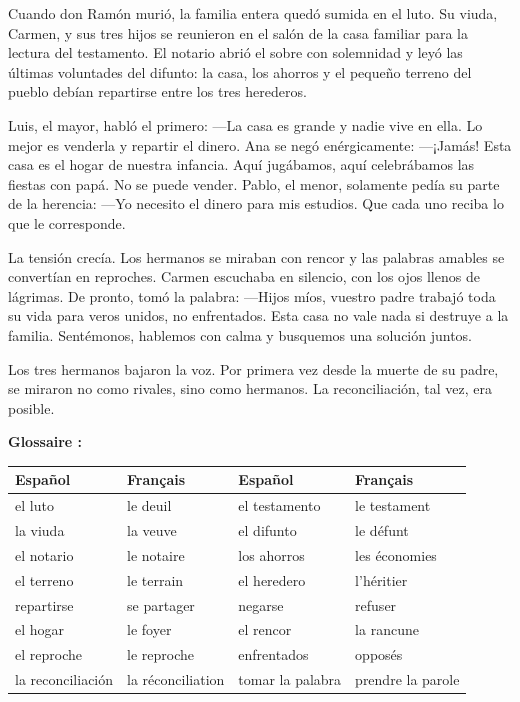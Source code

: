 \documentclass[11pt]{article}
\begin{document}
\begin{textebox}
Cuando don Ramón murió, la familia entera quedó sumida en el luto. Su viuda, Carmen, y sus tres hijos se reunieron en el salón de la casa familiar para la lectura del testamento. El notario abrió el sobre con solemnidad y leyó las últimas voluntades del difunto: la casa, los ahorros y el pequeño terreno del pueblo debían repartirse entre los tres herederos.

Luis, el mayor, habló el primero:
—La casa es grande y nadie vive en ella. Lo mejor es venderla y repartir el dinero.
Ana se negó enérgicamente:
—¡Jamás! Esta casa es el hogar de nuestra infancia. Aquí jugábamos, aquí celebrábamos las fiestas con papá. No se puede vender.
Pablo, el menor, solamente pedía su parte de la herencia:
—Yo necesito el dinero para mis estudios. Que cada uno reciba lo que le corresponde.

La tensión crecía. Los hermanos se miraban con rencor y las palabras amables se convertían en reproches. Carmen escuchaba en silencio, con los ojos llenos de lágrimas. De pronto, tomó la palabra:
—Hijos míos, vuestro padre trabajó toda su vida para veros unidos, no enfrentados. Esta casa no vale nada si destruye a la familia. Sentémonos, hablemos con calma y busquemos una solución juntos.

Los tres hermanos bajaron la voz. Por primera vez desde la muerte de su padre, se miraron no como rivales, sino como hermanos. La reconciliación, tal vez, era posible.
\end{textebox}

\textbf{Glossaire :}

\begin{center}
\begin{tabularx}{\linewidth}{|l|X|l|X|}
\hline
\rowcolor{popblueL} \textbf{Español} & \textbf{Français} & \textbf{Español} & \textbf{Français} \\
\hline
el luto & le deuil & el testamento & le testament \\
\hline
la viuda & la veuve & el difunto & le défunt \\
\hline
el notario & le notaire & los ahorros & les économies \\
\hline
el terreno & le terrain & el heredero & l'héritier \\
\hline
repartirse & se partager & negarse & refuser \\
\hline
el hogar & le foyer & el rencor & la rancune \\
\hline
el reproche & le reproche & enfrentados & opposés \\
\hline
la reconciliación & la réconciliation & tomar la palabra & prendre la parole \\
\hline
\end{tabularx}
\end{center}
\end{document}
